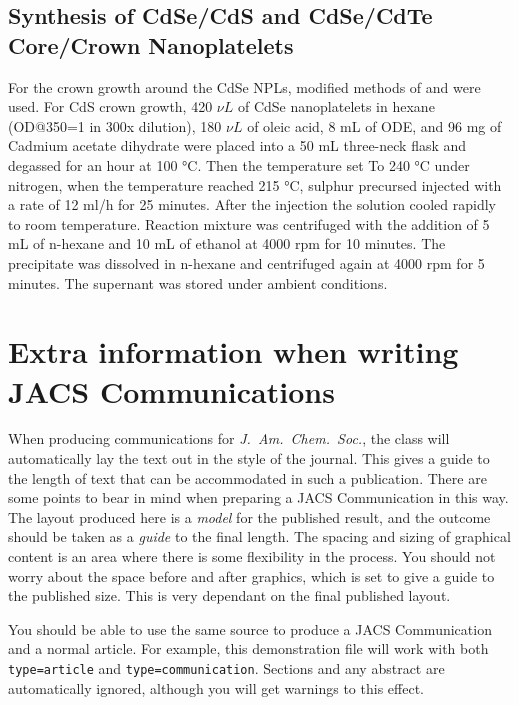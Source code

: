 \documentclass[journal=jacsat,manuscript=article]{achemso}
\begin{document}
\subsection{Synthesis of CdSe/CdS and CdSe/CdTe Core/Crown Nanoplatelets}
For the crown growth around the CdSe NPLs, modified methods of 
\cite{cdse/cdte} and \cite{cdse/cds} were used.
For CdS crown growth, 420 $\nu L$ of CdSe nanoplatelets in hexane
(OD@350=1 in 300x dilution), 180 $\nu L$ of oleic acid, 8 mL of ODE, and 96 mg
of Cadmium acetate dihydrate were placed into a 50 mL three-neck flask and degassed
for an hour at 100 °C. Then the temperature set To 240 °C under nitrogen,
when the temperature reached 215 °C, sulphur precursed injected with a rate of 
12 ml/h for 25 minutes. After the injection the solution cooled rapidly to 
room temperature. Reaction mixture was centrifuged with the addition of 5 mL 
of n-hexane and 10 mL of ethanol at 4000 rpm for 10 minutes. 
The precipitate was dissolved in n-hexane and centrifuged again
at 4000  rpm for 5 minutes. The supernant was stored under ambient conditions.




\section{Extra information when writing JACS Communications}

When producing communications for \emph{J.~Am.\ Chem.\ Soc.}, the
class will automatically lay the text out in the style of the
journal. This gives a guide to the length of text that can be
accommodated in such a publication. There are some points to bear in
mind when preparing a JACS Communication in this way.  The layout
produced here is a \emph{model} for the published result, and the
outcome should be taken as a \emph{guide} to the final length. The
spacing and sizing of graphical content is an area where there is
some flexibility in the process.  You should not worry about the
space before and after graphics, which is set to give a guide to the
published size. This is very dependant on the final published layout.

You should be able to use the same source to produce a JACS
Communication and a normal article.  For example, this demonstration
file will work with both \texttt{type=article} and
\texttt{type=communication}. Sections and any abstract are
automatically ignored, although you will get warnings to this effect.
\end{document}
